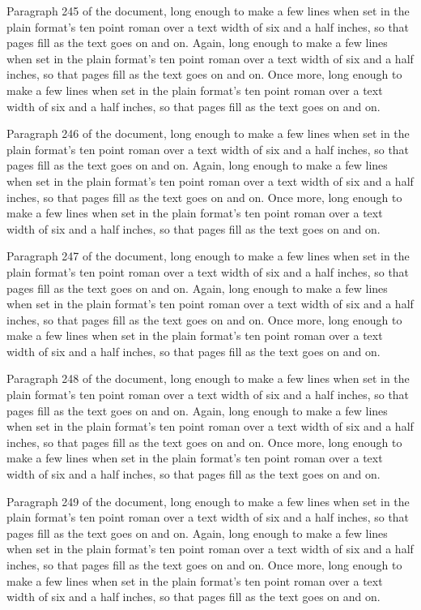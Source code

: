 Paragraph 245 of the document, long enough to make a few lines when set in the plain format's ten point roman over a text width of six and a half inches, so that pages fill as the text goes on and on. Again, long enough to make a few lines when set in the plain format's ten point roman over a text width of six and a half inches, so that pages fill as the text goes on and on. Once more, long enough to make a few lines when set in the plain format's ten point roman over a text width of six and a half inches, so that pages fill as the text goes on and on.

Paragraph 246 of the document, long enough to make a few lines when set in the plain format's ten point roman over a text width of six and a half inches, so that pages fill as the text goes on and on. Again, long enough to make a few lines when set in the plain format's ten point roman over a text width of six and a half inches, so that pages fill as the text goes on and on. Once more, long enough to make a few lines when set in the plain format's ten point roman over a text width of six and a half inches, so that pages fill as the text goes on and on.

Paragraph 247 of the document, long enough to make a few lines when set in the plain format's ten point roman over a text width of six and a half inches, so that pages fill as the text goes on and on. Again, long enough to make a few lines when set in the plain format's ten point roman over a text width of six and a half inches, so that pages fill as the text goes on and on. Once more, long enough to make a few lines when set in the plain format's ten point roman over a text width of six and a half inches, so that pages fill as the text goes on and on.

Paragraph 248 of the document, long enough to make a few lines when set in the plain format's ten point roman over a text width of six and a half inches, so that pages fill as the text goes on and on. Again, long enough to make a few lines when set in the plain format's ten point roman over a text width of six and a half inches, so that pages fill as the text goes on and on. Once more, long enough to make a few lines when set in the plain format's ten point roman over a text width of six and a half inches, so that pages fill as the text goes on and on.

Paragraph 249 of the document, long enough to make a few lines when set in the plain format's ten point roman over a text width of six and a half inches, so that pages fill as the text goes on and on. Again, long enough to make a few lines when set in the plain format's ten point roman over a text width of six and a half inches, so that pages fill as the text goes on and on. Once more, long enough to make a few lines when set in the plain format's ten point roman over a text width of six and a half inches, so that pages fill as the text goes on and on.

